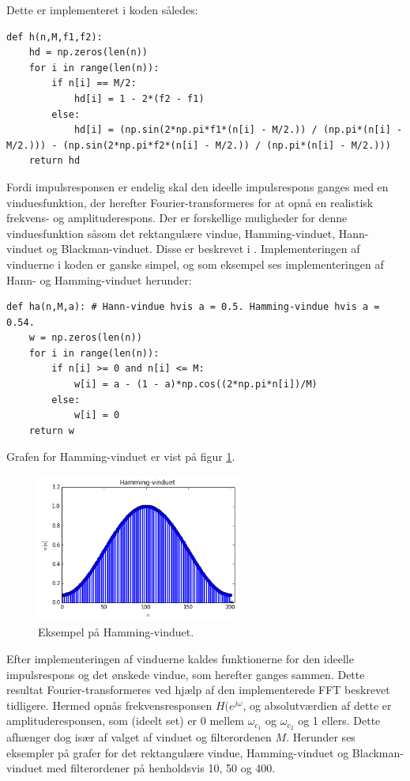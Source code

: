 Dette er implementeret i koden således:
\begin{lstlisting}
def h(n,M,f1,f2):
    hd = np.zeros(len(n))
    for i in range(len(n)):
        if n[i] == M/2:
            hd[i] = 1 - 2*(f2 - f1)
        else:
            hd[i] = (np.sin(2*np.pi*f1*(n[i] - M/2.)) / (np.pi*(n[i] - M/2.))) - (np.sin(2*np.pi*f2*(n[i] - M/2.)) / (np.pi*(n[i] - M/2.)))
    return hd
\end{lstlisting}

Fordi impulsresponsen er endelig skal den ideelle impulsrespons ganges med en vinduesfunktion, der herefter Fourier-transformeres for at opnå en realistisk frekvens- og amplituderespons. Der er forskellige muligheder for denne vinduesfunktion såsom det rektangulære vindue, Hamming-vinduet, Hann-vinduet og Blackman-vinduet. Disse er beskrevet i \cite{side 558-559, DTSP}. Implementeringen af vinduerne i koden er ganske simpel, og som eksempel ses implementeringen af Hann- og Hamming-vinduet herunder:
\begin{lstlisting}
def ha(n,M,a): # Hann-vindue hvis a = 0.5. Hamming-vindue hvis a = 0.54.
    w = np.zeros(len(n))
    for i in range(len(n)):
        if n[i] >= 0 and n[i] <= M:
            w[i] = a - (1 - a)*np.cos((2*np.pi*n[i])/M)
        else:
            w[i] = 0
    return w
\end{lstlisting}

Grafen for Hamming-vinduet er vist på figur \ref{fig:Hamming}.
\begin{figure}[H]
    \centering
    \includegraphics[width = 0.6\textwidth]{figures/Hamming-vindue.PNG}
    \caption{Eksempel på Hamming-vinduet.}
    \label{fig:Hamming}
\end{figure}

Efter implementeringen af vinduerne kaldes funktionerne for den ideelle impulsrespons og det ønskede vindue, som herefter ganges sammen. Dette resultat Fourier-transformeres ved hjælp af den implementerede FFT beskrevet tidligere. Hermed opnås frekvensresponsen $H(e^{j\omega}$, og absolutværdien af dette er amplituderesponsen, som (ideelt set) er 0 mellem $\omega_{c_1}$ og $\omega_{c_2}$ og 1 ellers. Dette afhænger dog især af valget af vinduet og filterordenen $M$. Herunder ses eksempler på grafer for det rektangulære vindue, Hamming-vinduet og Blackman-vinduet med filterordener på henholdsvis 10, 50 og 400.